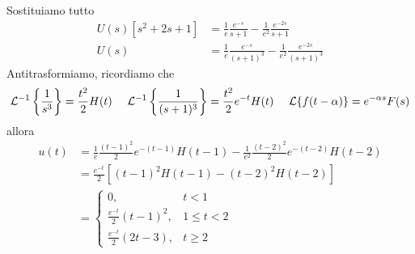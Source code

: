 Sostituiamo tutto
\begin{equation*}
\begin{aligned}
U(s)\left[ s^{2} + 2s + 1\right] & = \frac{1}{e}\frac{e^{- s}}{s + 1} - \frac{1}{e^{2}}\frac{e^{- 2s}}{s + 1}\\
U(s) & = \frac{1}{e}\frac{e^{- s}}{(s + 1)^{3}} - \frac{1}{e^{2}}\frac{e^{- 2s}}{(s + 1)^{3}}
\end{aligned}
\end{equation*}
Antitrasformiamo, ricordiamo che
\begin{equation*}
\Lc^{- 1}\left\{\frac{1}{s^{3}}\right\} = \frac{t^{2}}{2} H(t) \ \ \ \ \Lc^{- 1}\left\{\frac{1}{(s + 1)^{3}}\right\} = \frac{t^{2}}{2} e^{- t} H(t) \ \ \ \ \Lc\{f(t - \alpha)\} = e^{- \alpha s} F(s)
\end{equation*}
allora
\begin{align*}
u(t) & = \frac{1}{e}\frac{(t - 1)^{2}}{2} e^{- (t - 1)} H(t - 1) - \frac{1}{e^{2}}\frac{(t - 2)^{2}}{2} e^{- (t - 2)} H(t - 2)\\
 & = \frac{e^{- t}}{2}\left[(t - 1)^{2} H(t - 1) - (t - 2)^{2} H(t - 2)\right]\\
 & = 
 \begin{cases}
0, & t < 1\\
\frac{e^{- t}}{2}(t - 1)^{2}, & 1 \leq t < 2\\
\frac{e^{- t}}{2}(2t - 3), & t \geq 2
\end{cases}
\end{align*}
\Soluzione

